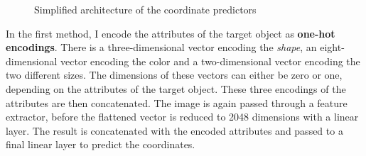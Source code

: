 \begin{figure}[h]
    \centering
    \caption{Simplified architecture of the coordinate predictors}
\end{figure}

In the first method, I encode the attributes of the target object as \textbf{one-hot encodings}.
There is a three-dimensional vector encoding the \emph{shape}, an eight-dimensional vector encoding the color and a two-dimensional vector encoding the two different sizes.
The dimensions of these vectors can either be zero or one, depending on the attributes of the target object.
These three encodings of the attributes are then concatenated.
The image is again passed through a feature extractor, before the flattened vector is reduced to 2048 dimensions with a linear layer.
The result is concatenated with the encoded attributes and passed to a final linear layer to predict the coordinates.

